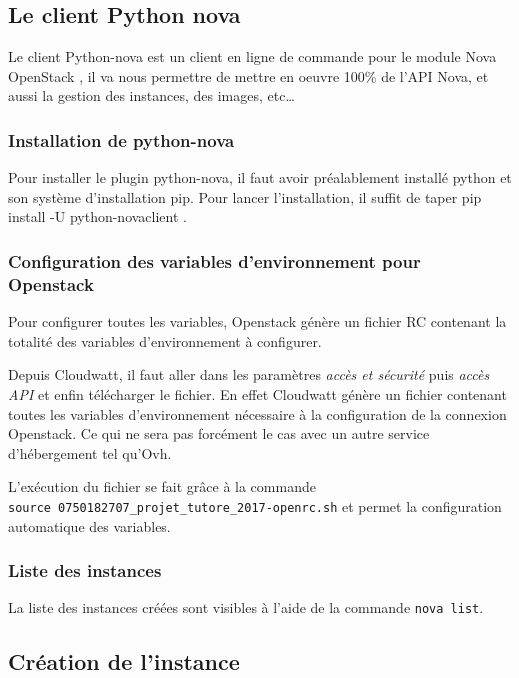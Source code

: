 \documentclass[]{article}
\begin{document}
\subsection{Le client Python nova}\label{le-client-python-nova}

Le client Python-nova est un client en ligne de commande pour le module
Nova OpenStack , il va nous permettre de mettre en oeuvre 100\% de l'API
Nova, et aussi la gestion des instances, des images, etc\ldots{}

\subsubsection{Installation de
python-nova}\label{installation-de-python-nova}

Pour installer le plugin python-nova, il faut avoir préalablement
installé python et son système d'installation pip. Pour lancer
l'installation, il suffit de taper pip install -U python-novaclient .

\subsubsection{Configuration des variables d'environnement pour
Openstack}\label{configuration-des-variables-denvironnement-pour-openstack}

Pour configurer toutes les variables, Openstack génère un fichier RC
contenant la totalité des variables d'environnement à configurer.

Depuis Cloudwatt, il faut aller dans les paramètres \emph{accès et
sécurité} puis \emph{accès API} et enfin télécharger le fichier. En
effet Cloudwatt génère un fichier contenant toutes les variables
d'environnement nécessaire à la configuration de la connexion Openstack.
Ce qui ne sera pas forcément le cas avec un autre service d'hébergement tel qu'Ovh.

L'exécution du fichier se fait grâce à la commande
\texttt{source\ 0750182707\_projet\_tutore\_2017-openrc.sh} et permet la
configuration automatique des variables.

\subsubsection{Liste des instances}\label{liste-des-instances}

La liste des instances créées sont visibles à l'aide de la commande
\texttt{nova\ list}.

\subsection{Création de l'instance}\label{cruxe9ation-de-linstance}
\end{document}
